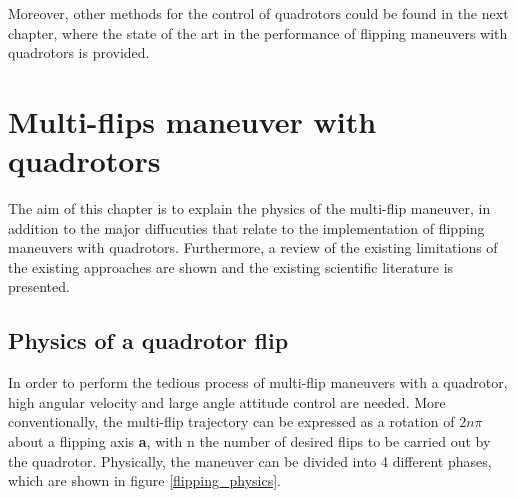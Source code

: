 \documentclass{thesisreport}
\begin{document}
\noindent Moreover, other methods for the control of quadrotors could be found  in the next chapter, where the state of the art in the performance of flipping maneuvers with quadrotors is provided. 
 
 
 \chapter{Multi-flips maneuver with quadrotors}


The aim of this chapter is to explain the physics of the multi-flip maneuver, in addition to the major diffucuties that relate to the implementation of flipping maneuvers with quadrotors. Furthermore, a review of the existing limitations of the existing approaches are shown and the existing scientific literature is presented. 


\section{Physics of a quadrotor flip}\label{multiflip_physics}


In order to perform the tedious process of multi-flip maneuvers with a quadrotor, high angular velocity and large angle attitude control are needed. More conventionally, the multi-flip trajectory can be expressed as a rotation of $2n \pi$ about a flipping axis \textbf{a}, with n the number of desired flips to be carried out by the quadrotor. Physically, the maneuver can be divided into 4 different phases, which are shown in figure \ref{flipping_physics}.
\end{document}
